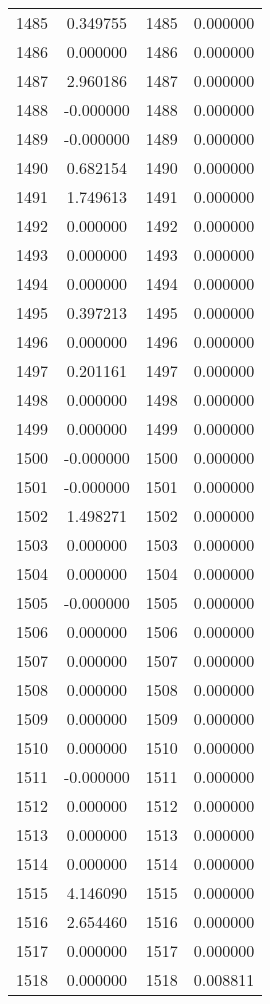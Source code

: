 \documentclass[12pt]{article}
\begin{document}
\begin{longtable}{@{}cccc@{}}
1485 & 0.349755 & 1485 & 0.000000 \\
1486 & 0.000000 & 1486 & 0.000000 \\
1487 & 2.960186 & 1487 & 0.000000 \\
1488 & -0.000000 & 1488 & 0.000000 \\
1489 & -0.000000 & 1489 & 0.000000 \\
1490 & 0.682154 & 1490 & 0.000000 \\
1491 & 1.749613 & 1491 & 0.000000 \\
1492 & 0.000000 & 1492 & 0.000000 \\
1493 & 0.000000 & 1493 & 0.000000 \\
1494 & 0.000000 & 1494 & 0.000000 \\
1495 & 0.397213 & 1495 & 0.000000 \\
1496 & 0.000000 & 1496 & 0.000000 \\
1497 & 0.201161 & 1497 & 0.000000 \\
1498 & 0.000000 & 1498 & 0.000000 \\
1499 & 0.000000 & 1499 & 0.000000 \\
1500 & -0.000000 & 1500 & 0.000000 \\
1501 & -0.000000 & 1501 & 0.000000 \\
1502 & 1.498271 & 1502 & 0.000000 \\
1503 & 0.000000 & 1503 & 0.000000 \\
1504 & 0.000000 & 1504 & 0.000000 \\
1505 & -0.000000 & 1505 & 0.000000 \\
1506 & 0.000000 & 1506 & 0.000000 \\
1507 & 0.000000 & 1507 & 0.000000 \\
1508 & 0.000000 & 1508 & 0.000000 \\
1509 & 0.000000 & 1509 & 0.000000 \\
1510 & 0.000000 & 1510 & 0.000000 \\
1511 & -0.000000 & 1511 & 0.000000 \\
1512 & 0.000000 & 1512 & 0.000000 \\
1513 & 0.000000 & 1513 & 0.000000 \\
1514 & 0.000000 & 1514 & 0.000000 \\
1515 & 4.146090 & 1515 & 0.000000 \\
1516 & 2.654460 & 1516 & 0.000000 \\
1517 & 0.000000 & 1517 & 0.000000 \\
1518 & 0.000000 & 1518 & 0.008811 \\

\end{longtable}
\end{document}
